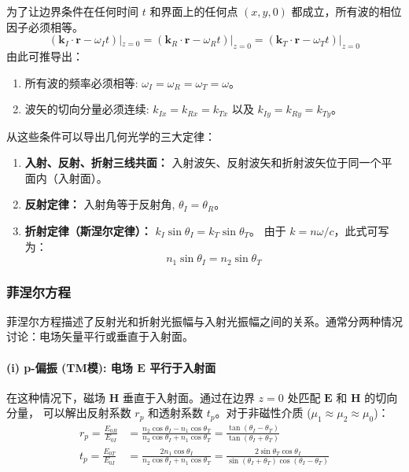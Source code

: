 \documentclass[fontset=none]{ctexart}
\begin{document}
\begin{theorem}[反射和折射定律]
为了让边界条件在任何时间 $t$ 和界面上的任何点 $(x,y,0)$ 都成立，所有波的相位因子必须相等。
\begin{equation}
(\bm{k}_I \cdot \bm{r} - \omega_I t)|_{z=0} = (\bm{k}_R \cdot \bm{r} - \omega_R t)|_{z=0} 
= (\bm{k}_T \cdot \bm{r} - \omega_T t)|_{z=0}
\end{equation}
由此可推导出：
\begin{enumerate}
    \item 所有波的频率必须相等: $\omega_I = \omega_R = \omega_T = \omega$。
    \item 波矢的切向分量必须连续: $k_{Ix} = k_{Rx} = k_{Tx}$ 以及 $k_{Iy} = k_{Ry} = k_{Ty}$。
\end{enumerate}
从这些条件可以导出几何光学的三大定律：
\begin{enumerate}
    \item \textbf{入射、反射、折射三线共面：} 入射波矢、反射波矢和折射波矢位于同一个平面内（入射面）。
    \item \textbf{反射定律：} 入射角等于反射角, $\theta_I = \theta_R$。
    \item \textbf{折射定律（斯涅尔定律）：} $k_I \sin\theta_I = k_T \sin\theta_T$。
    由于 $k=n\omega/c$，此式可写为：
    \begin{equation}
    n_1 \sin\theta_I = n_2 \sin\theta_T
    \end{equation}
\end{enumerate}
\end{theorem}

\subsubsection{菲涅尔方程}
菲涅尔方程描述了反射光和折射光振幅与入射光振幅之间的关系。通常分两种情况讨论：电场矢量平行或垂直于入射面。

\paragraph{(i) p-偏振 (TM模): 电场 $\bm{E}$ 平行于入射面}
在这种情况下，磁场 $\bm{H}$ 垂直于入射面。通过在边界 $z=0$ 处匹配 $\bm{E}$ 和 $\bm{H}$ 的切向分量，
可以解出反射系数 $r_p$ 和透射系数 $t_p$。对于非磁性介质 ($\mu_1 \approx \mu_2 \approx \mu_0$)：
\begin{align}
r_p = \frac{E_{0R}}{E_{0I}} 
&= \frac{n_2 \cos\theta_I - n_1 \cos\theta_T}{n_2 \cos\theta_I + n_1 \cos\theta_T} 
= \frac{\tan(\theta_I - \theta_T)}{\tan(\theta_I + \theta_T)} \\
t_p = \frac{E_{0T}}{E_{0I}} 
&= \frac{2 n_1 \cos\theta_I}{n_2 \cos\theta_I + n_1 \cos\theta_T} 
= \frac{2 \sin\theta_T \cos\theta_I}{\sin(\theta_I + \theta_T)\cos(\theta_I - \theta_T)}
\end{align}
\end{document}
